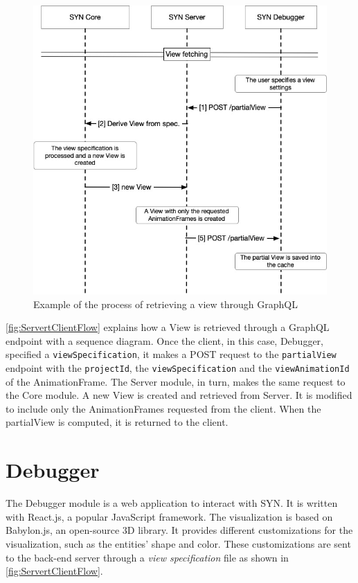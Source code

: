 \begin{figure}
    \center
    \includegraphics[width=\textwidth]{ServertClientFlow.jpg}
    \caption{Example of the process of retrieving a view through GraphQL}
    \label{fig:ServertClientFlow}
\end{figure}


\autoref{fig:ServertClientFlow} explains how a View is retrieved through a GraphQL endpoint with a sequence diagram. Once the client, in this case, Debugger, specified a \texttt{viewSpecification}, it makes a POST request to the 
\texttt{partialView} endpoint with the \texttt{projectId}, the \texttt{viewSpecification} and the \texttt{viewAnimationId} of the AnimationFrame. The Server module, in turn, makes the same request to the Core module. A new View is created and retrieved from Server. It is modified to include only the AnimationFrames requested from the client. When the partialView is computed, it is returned to the client. 


\section{Debugger}
\label{s:SYNDebugger}

The Debugger module is a web application to interact with SYN. It is written with React.js, a popular JavaScript framework. 
The visualization is based on Babylon.js, an open-source 3D library. 
It provides different customizations for the visualization, such as the entities' shape and color. 
These customizations are sent to the back-end server through a {\em view specification} file as shown in \autoref{fig:ServertClientFlow}. 

